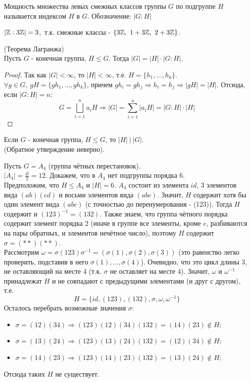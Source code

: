\begin{definition}
    Мощность множества левых смежных классов группы $G$ по подгруппе $H$ называется индексом $H$ в $G$. Обозначение: $|G: H|$
\end{definition}
\begin{example}
    $|\mathbb{Z}: 3\mathbb{Z}|=3$,\ т.к. смежные классы - $\{3\mathbb{Z},\ 1+3\mathbb{Z},\ 2+3\mathbb{Z}\}$.
\end{example}
\begin{theorem} (Теорема Лагранжа)\\
    Пусть $G$ - конечная группа, $H\leq G$. Тогда $|G|=|H|\cdot|G:H|$.
\end{theorem}
\begin{proof}
    Так как $|G|<\infty$, то $|H|<\infty$, т.е. $H=\{h_1,\dots,h_k\}$.\\
    $\forall g\in G,\ gH=\{gh_1,\dots,gh_k\}$, причем $gh_i=gh_j \Rightarrow h_i=h_j \Rightarrow |gH|=|H|$. Отсюда, если $|G:H| = n$:
    \[G=\bigsqcup \limits_{i=1}^{n} a_iH \Longrightarrow |G| = \sum \limits_{i=1}^{n} |a_iH| = |G:H|\cdot |H|\]
\end{proof}
\begin{consequensenum}
    Если $G$ - конечная группа, $H\leq G$, то $|H|\ |\ |G|$.\\
    (Обратное утверждение неверно).
\end{consequensenum}
\begin{exercise}
    Пусть $G = A_4$ (группа чётных перестановок).\\
    $|A_4|=\frac{4!}{2}=12$. Докажем, что в $A_4$ нет подгруппы порядка 6.\\
    Предположим, что $H \leq A_4$ и $|H| = 6$. $A_4$ состоит из элемента $id$, 3 элементов вида $(ab)(cd)$ и восьми элементов вида $(abc)$. Значит, $H$ содержит хотя бы один элемент вида $(abc)$ (с точностью до перенумерования - (123)). Тогда $H$ содержит и $(123)^{-1} = (132)$. Также знаем, что группа чётного порядка содержит элемент порядка 2 (иначе в группе все элементы, кроме $e$, разбиваются на пары обратных, и элементов нечётное число), поэтому $H$ содержит $\sigma = (**)(**)$.\\
    Рассмотрим $\omega = \sigma(123)\sigma^{-1} = (\sigma(1), \sigma(2), \sigma(3))$ (это равенство легко проверить, подставив в него $\sigma(1),...,\sigma(4)$). Очевидно, что это цикл длины 3, не оставляющий на месте 4 (т.к. $\sigma$ не оставляет на месте 4). Значит, $\omega$ и $\omega^{-1}$ принадлежат $H$ и не совпадают с предыдущими элементами (и друг с другом), т.е. 
    \[H = \{id, (123), (132), \sigma, \omega, \omega^{-1}\}\]
    Осталось перебрать возможные значения $\sigma$:
    \begin{itemize}
        \item $\sigma = (12)(34) \Longrightarrow (123)(12)(34)(132) = (14)(23) \notin H$;
        \item $\sigma = (13)(24) \Longrightarrow (123)(13)(24)(132) = (12)(34) \notin H$;
        \item $\sigma = (14)(23) \Longrightarrow (123)(14)(23)(132) = (13)(24) \notin H$;
    \end{itemize}
    Отсюда таких $H$ не существует.
\end{exercise}  
